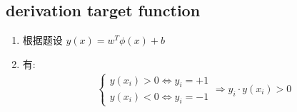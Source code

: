 \documentclass[oneside, 12pt]{ctexbook}
\begin{document}
			\subsection{\quad derivation target function}
				\begin{enumerate}
					\item 根据题设 $y(x) = w^T \phi(x) + b$
					
					\item 有: 
						\begin{align}
							\left\{ 
								\begin{matrix}
									y(x_i) > 0 \Leftrightarrow y_i = +1\\
									y(x_i) < 0 \Leftrightarrow y_i = -1
								\end{matrix}
								\Rightarrow
								y_i \cdot y(x_i)>0
							\right.
						\end{align}
					

\end{enumerate}
\end{document}
